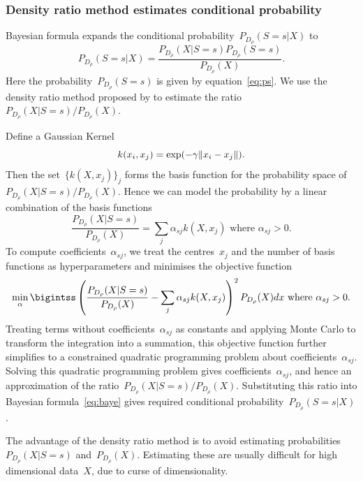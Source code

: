 \documentclass[12pt]{article} %
\DeclarePairedDelimiter{\norm}{\lVert}{\rVert}
\begin{document}
\subsubsection{Density ratio method estimates conditional probability}\label{method22}
Bayesian formula expands the conditional probability~$P_{D_\rho}(S=s|X)$ to
\begin{equation}
   P_{D_\rho}(S=s|X)=\frac{P_{D_\rho}(X|S=s)P_{D_\rho}(S=s)}{P_{D_\rho}(X)}.\label{eq:baye}
\end{equation}
Here the probability~$P_{D_\rho}(S=s)$ is given by equation~\eqref{eq:ps}. We use the density ratio method proposed by \citet{DBLP:journals/jmlr/KanamoriHS09} to estimate the ratio~${P_{D_\rho}(X|S=s)}/{P_{D_\rho}(X)}$.

Define a Gaussian Kernel
\begin{equation}\label{eq:gauss}
k(x_i,x_j)=\exp(-\gamma\norm{x_i-x_j}).
\end{equation}
Then the set~$\{k(X,x_j) \}_j$ forms the basis function for the probability space of ${P_{D_\rho}(X|S=s)}/{P_{D_\rho}(X)}$. Hence we can model the probability by a linear combination of the basis functions
\begin{equation*}
   \frac{P_{D_\rho}(X|S=s)}{P_{D_\rho}(X)}=\sum_j \alpha_{sj} k(X,x_j) \text{ where }\alpha_{sj}>0.%
\end{equation*}
To compute coefficients~$\alpha_{sj}$, we treat the centres~$x_j$ and the number of basis functions as hyperparameters and minimises the objective function
\begin{equation*}
  \min_\alpha \bigintss \left(\frac{P_{D_\rho}(X|S=s)}{P_{D_\rho}(X)}-\sum_j \alpha_{sj} k(X,x_j)\right)^2P_{D_\rho}(X)dx \text{ where }\alpha_{sj}>0.
\end{equation*}
Treating terms without coefficients~$\alpha_{sj}$ as constants and applying Monte Carlo to transform the integration into a summation, this objective function further simplifies to a constrained quadratic programming problem about coefficients~$\alpha_{sj}$. Solving this quadratic programming problem gives coefficients~$\alpha_{sj}$, and hence an approximation of the ratio~${P_{D_\rho}(X|S=s)}/{P_{D_\rho}(X)}$. Substituting this ratio into Bayesian formula~\eqref{eq:baye} gives required conditional probability~$P_{D_\rho}(S=s|X)$.

The advantage of the density ratio method is to avoid estimating probabilities~${P_{D_\rho}(X|S=s)}$ and~${P_{D_\rho}(X)}$. Estimating these are usually difficult for high dimensional data~$X$, due to curse of dimensionality.
\end{document}
